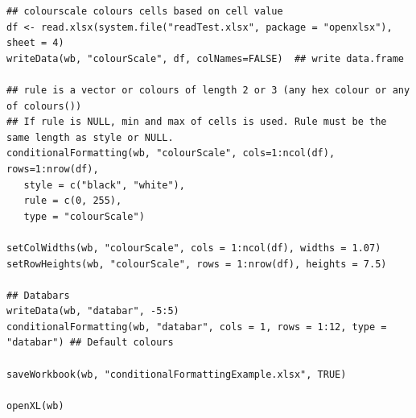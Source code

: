 \documentclass[11pt]{article}\usepackage[]{graphicx}\usepackage[]{color}
\begin{document}
\begin{verbatim}
## colourscale colours cells based on cell value
df <- read.xlsx(system.file("readTest.xlsx", package = "openxlsx"), sheet = 4)
writeData(wb, "colourScale", df, colNames=FALSE)  ## write data.frame

## rule is a vector or colours of length 2 or 3 (any hex colour or any of colours())
## If rule is NULL, min and max of cells is used. Rule must be the same length as style or NULL.
conditionalFormatting(wb, "colourScale", cols=1:ncol(df), rows=1:nrow(df),
   style = c("black", "white"), 
   rule = c(0, 255), 
   type = "colourScale")

setColWidths(wb, "colourScale", cols = 1:ncol(df), widths = 1.07)
setRowHeights(wb, "colourScale", rows = 1:nrow(df), heights = 7.5) 

## Databars
writeData(wb, "databar", -5:5)
conditionalFormatting(wb, "databar", cols = 1, rows = 1:12, type = "databar") ## Default colours

saveWorkbook(wb, "conditionalFormattingExample.xlsx", TRUE)

openXL(wb)


\end{verbatim}


\newpage
\end{document}
